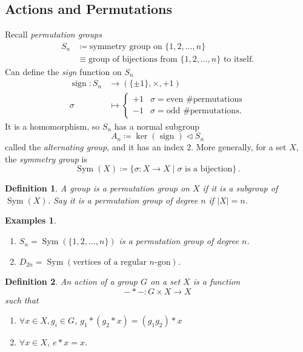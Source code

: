 \documentclass{article}
\theoremstyle{plain}\theoremheaderfont{\normalfont\itshape}\theorembodyfont{\rmfamily}\theoremseparator{.}\newtheorem*{rem}{Remark}\newtheorem*{ex}{Example}\newtheorem*{proof}{Proof}\newtheorem*{altp}{Alternative proof}\newtheorem*{nonex}{Non-Example}
\theoremstyle{plain}\theoremheaderfont{\normalfont\bfseries}\theorembodyfont{\rmfamily}\theoremseparator{.}\newtheorem{thm}{Theorem}[section]\newtheorem{lem}[thm]{Lemma}\newtheorem{prop}[thm]{Proposition}\newtheorem*{cor}{Corollary}\newtheorem{defn}[thm]{Definition}\newtheorem{clm}[thm]{Claim}\newtheorem{clminproof}{Claim}\newtheorem*{notn}{Notation}\newtheorem*{exer}{Exercise}\newtheorem*{lemnn}{Lemma}
\theoremstyle{break}\theoremheaderfont{\normalfont\itshape}\theorembodyfont{\rmfamily}\theoremseparator{.\medskip}\newtheorem*{proofskip}{Proof}\newtheorem*{exs}{Examples}\newtheorem*{rems}{Remarks}\newtheorem*{obs}{Observations}
\theoremstyle{break}\theoremheaderfont{\normalfont\bfseries}\theorembodyfont{\rmfamily}\theoremseparator{.\medskip}\newtheorem{lemskip}[thm]{Lemma}\newtheorem{defnskip}[thm]{Definition}\newtheorem{propskip}[thm]{Proposition}\newtheorem{thmskip}[thm]{Theorem}
\numberwithin{equation}{section}
\newcommand{\abs}[1]{\left|#1\right|}
\DeclareMathOperator*{\sign}{sign}
\DeclareMathOperator*{\Sym}{Sym}
\begin{document}
    \subsection{Actions and Permutations}
    Recall \textit{permutation groups}
    \begin{align*}
        S_n&\coloneqq\text{symmetry group on }\{1,2,\dots,n\}\\
        &\equiv\text{group of bijections from }\{1,2,\dots,n\}\text{ to itself.}
    \end{align*}
    Can define the \textit{sign} function on \(S_n\)
    \begin{align*}
        \sign:S_n&\longrightarrow(\{\pm 1\},\times,+1)\\
        \sigma&\longmapsto\begin{cases}
            +1 & \sigma=\text{even \# permutations}\\
            -1 & \sigma=\text{odd \# permutations.}
        \end{cases}
    \end{align*}
    It is a homomorphism, so \(S_n\) has a normal subgroup
    \[A_n\coloneqq\ker(\sign)\lhd S_n\]
    called the \textit{alternating group}, and it has an index \(2\). More generally, for a set \(X\), the \textit{symmetry group} is
    \[\Sym(X)\coloneqq\{\sigma:X\to X\mid\sigma\text{ is a bijection}\}\,.\]
    \begin{defn}
        A group is a \textit{permutation group} on \(X\) if it is a subgroup of \(\Sym(X)\). Say it is a permutation group of \textit{degree} \(n\) if \(\abs{X}=n\).
    \end{defn}
    \begin{exs}
        \begin{enumerate}[topsep=0pt,label=(\roman*)]
            \item \(S_n=\Sym(\{1,2,\dots,n\})\) is a permutation group of degree \(n\).
            \item \(D_{2n}=\Sym(\text{vertices of a regular }n\text{-gon})\).
        \end{enumerate}
    \end{exs}
    \begin{defn}
        An \textit{action} of a group \(G\) on a set \(X\) is a function
        \[-*-:G\times X\to X\]
        such that
        \begin{enumerate}[topsep=0pt,label=(\roman*)]
            \item \(\forall x\in X, g_i\in G\), \(g_1*(g_2*x)=(g_1g_2)*x\)
            \item \(\forall x\in X\), \(e*x=x\).
        \end{enumerate}
    \end{defn}
\end{document}

